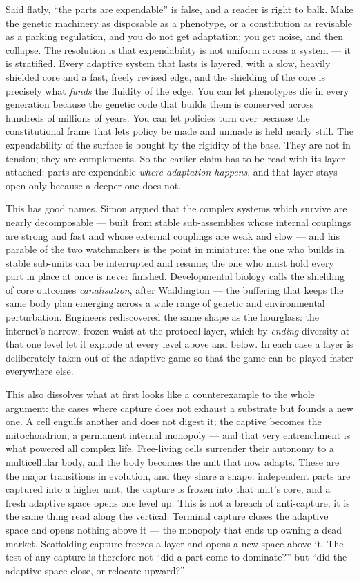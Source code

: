 \documentclass[11pt, a4paper]{report}
\begin{document}
Said flatly, ``the parts are expendable'' is false, and a reader is right to balk. Make the genetic machinery as disposable as a phenotype, or a constitution as revisable as a parking regulation, and you do not get adaptation; you get noise, and then collapse. The resolution is that expendability is not uniform across a system --- it is stratified. Every adaptive system that lasts is layered, with a slow, heavily shielded core and a fast, freely revised edge, and the shielding of the core is precisely what \textit{funds} the fluidity of the edge. You can let phenotypes die in every generation because the genetic code that builds them is conserved across hundreds of millions of years. You can let policies turn over because the constitutional frame that lets policy be made and unmade is held nearly still. The expendability of the surface is bought by the rigidity of the base. They are not in tension; they are complements. So the earlier claim has to be read with its layer attached: parts are expendable \textit{where adaptation happens}, and that layer stays open only because a deeper one does not.

This has good names. Simon argued that the complex systems which survive are nearly decomposable --- built from stable sub-assemblies whose internal couplings are strong and fast and whose external couplings are weak and slow --- and his parable of the two watchmakers is the point in miniature: the one who builds in stable sub-units can be interrupted and resume; the one who must hold every part in place at once is never finished. Developmental biology calls the shielding of core outcomes \textit{canalisation}, after Waddington --- the buffering that keeps the same body plan emerging across a wide range of genetic and environmental perturbation. Engineers rediscovered the same shape as the hourglass: the internet's narrow, frozen waist at the protocol layer, which by \textit{ending} diversity at that one level let it explode at every level above and below. In each case a layer is deliberately taken out of the adaptive game so that the game can be played faster everywhere else.

This also dissolves what at first looks like a counterexample to the whole argument: the cases where capture does not exhaust a substrate but founds a new one. A cell engulfs another and does not digest it; the captive becomes the mitochondrion, a permanent internal monopoly --- and that very entrenchment is what powered all complex life. Free-living cells surrender their autonomy to a multicellular body, and the body becomes the unit that now adapts. These are the major transitions in evolution, and they share a shape: independent parts are captured into a higher unit, the capture is frozen into that unit's core, and a fresh adaptive space opens one level up. This is not a breach of anti-capture; it is the same thing read along the vertical. Terminal capture closes the adaptive space and opens nothing above it --- the monopoly that ends up owning a dead market. Scaffolding capture freezes a layer and opens a new space above it. The test of any capture is therefore not ``did a part come to dominate?'' but ``did the adaptive space close, or relocate upward?''
\end{document}
